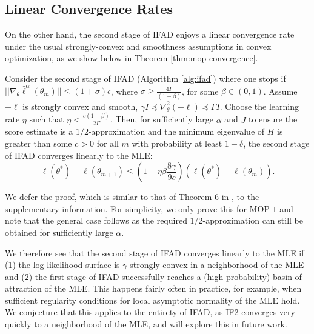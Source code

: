 \documentclass[11pt]{article}
\begin{document}
\subsection{Linear Convergence Rates}

On the other hand, the second stage of IFAD enjoys a linear convergence rate under the usual strongly-convex and smoothness assumptions in convex optimization, as we show below in Theorem \ref{thm:mop-convergence}.

\begin{thm}
    
Consider the second stage of IFAD (Algorithm \ref{alg:ifad}) where one stops if $||\nabla_\theta \hat\ell^\alpha(\theta_m)|| \leq (1+\sigma) \epsilon$, where $\sigma \geq \frac{4 \Gamma}{(1-\beta)}$, for some $\beta \in (0,1)$. Assume $-\ell$ is strongly convex and smooth, $\gamma I \preceq \nabla_\theta^2 (-\ell) \preceq \Gamma I$. Choose the learning rate $\eta$ such that $\eta \leq \frac{c(1-\beta)}{2\Gamma}$. Then, for sufficiently large $\alpha$ and $J$ to ensure the score estimate is a $1/2$-approximation and the minimum eigenvalue of $H$ is greater than some $c > 0$ for all $m$ with probability at least $1-\delta$, the second stage of IFAD converges linearly to the MLE:
\vspace*{-2mm}
$$
\ell(\theta^*) - \ell(\theta_{m+1}) \leq \left(1-\eta\beta\frac{8\gamma}{9c}\right)(\ell(\theta^*)-\ell(\theta_m)).
$$
    \label{thm:mop-convergence}
\end{thm}
\vspace*{-5mm}

We defer the proof, which is similar to that of Theorem 6 in \cite{mahoney16}, to the supplementary information. For simplicity, we only prove this for MOP-$1$ and note that the general case follows as the required $1/2$-approximation can still be obtained for sufficiently large $\alpha$. 

We therefore see that the second stage of IFAD converges linearly to the MLE if (1) the log-likelihood surface is $\gamma$-strongly convex in a neighborhood of the MLE and (2) the first stage of IFAD successfully reaches a (high-probability) basin of attraction of the MLE. This happens fairly often in practice, for example, when sufficient regularity conditions for local asymptotic normality of the MLE hold. We conjecture that this applies to the entirety of IFAD, as IF2 converges very quickly to a neighborhood of the MLE, and will explore this in future work.
\end{document}
